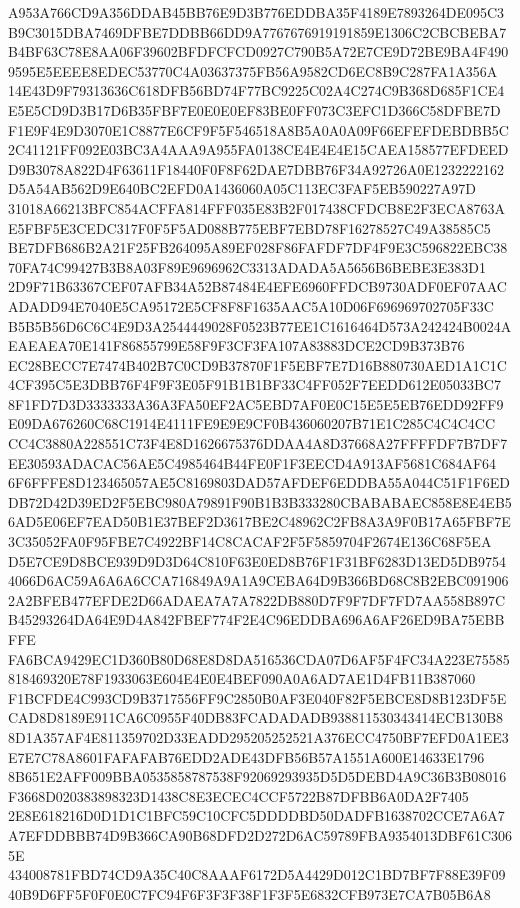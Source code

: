 \documentclass[UTF8,fontset=fandol,zihao=-4,a4paper]{ctexart}
\begin{document}
{{A953A766CD9A356DDAB45BB76E9D3B776EDDBA35F4189E7893264DE095C3B9C3015DBA7469DFBE7DDBB66DD9A7767676919191859E1306C2CBCBEBA7
B4BF63C78E8AA06F39602BFDFCFCD0927C790B5A72E7CE9D72BE9BA4F4909595E5EEEE8EDEC53770C4A03637375FB56A9582CD6EC8B9C287FA1A356A
14E43D9F79313636C618DFB56BD74F77BC9225C02A4C274C9B368D685F1CE4E5E5CD9D3B17D6B35FBF7E0E0E0EF83BE0FF073C3EFC1D366C58DFBE7D
F1E9F4E9D3070E1C8877E6CF9F5F546518A8B5A0A0A09F66EFEFDEBDBB5C2C41121FF092E03BC3A4AAA9A955FA0138CE4E4E4E15CAEA158577EFDEED
D9B3078A822D4F63611F18440F0F8F62DAE7DBB76F34A92726A0E1232222162D5A54AB562D9E640BC2EFD0A1436060A05C113EC3FAF5EB590227A97D
31018A66213BFC854ACFFA814FFF035E83B2F017438CFDCB8E2F3ECA8763AE5FBF5E3CEDC317F0F5F5AD088B775EBF7EBD78F16278527C49A38585C5
BE7DFB686B2A21F25FB264095A89EF028F86FAFDF7DF4F9E3C596822EBC3870FA74C99427B3B8A03F89E9696962C3313ADADA5A5656B6BEBE3E383D1
2D9F71B63367CEF07AFB34A52B87484E4EFE6960FFDCB9730ADF0EF07AACADADD94E7040E5CA95172E5CF8F8F1635AAC5A10D06F696969702705F33C
B5B5B56D6C6C4E9D3A2544449028F0523B77EE1C1616464D573A242424B0024AEAEAEA70E141F86855799E58F9F3CF3FA107A83883DCE2CD9B373B76
EC28BECC7E7474B402B7C0CD9B37870F1F5EBF7E7D16B880730AED1A1C1C4CF395C5E3DBB76F4F9F3E05F91B1B1BF33C4FF052F7EEDD612E05033BC7
8F1FD7D3D3333333A36A3FA50EF2AC5EBD7AF0E0C15E5E5EB76EDD92FF9E09DA676260C68C1914E4111FE9E9E9CF0B436060207B71E1C285C4C4C4CC
CC4C3880A228551C73F4E8D1626675376DDAA4A8D37668A27FFFFDF7B7DF7EE30593ADACAC56AE5C4985464B44FE0F1F3EECD4A913AF5681C684AF64
6F6FFFE8D123465057AE5C8169803DAD57AFDEF6EDDBA55A044C51F1F6EDDB72D42D39ED2F5EBC980A79891F90B1B3B333280CBABABAEC858E8E4EB5
6AD5E06EF7EAD50B1E37BEF2D3617BE2C48962C2FB8A3A9F0B17A65FBF7E3C35052FA0F95FBE7C4922BF14C8CACAF2F5F5859704F2674E136C68F5EA
D5E7CE9D8BCE939D9D3D64C810F63E0ED8B76F1F31BF6283D13ED5DB97544066D6AC59A6A6A6CCA716849A9A1A9CEBA64D9B366BD68C8B2EBC091906
2A2BFEB477EFDE2D66ADAEA7A7A7822DB880D7F9F7DF7FD7AA558B897CB45293264DA64E9D4A842FBEF774F2E4C96EDDBA696A6AF26ED9BA75EBBFFE
FA6BCA9429EC1D360B80D68E8D8DA516536CDA07D6AF5F4FC34A223E75585818469320E78F1933063E604E4E0E4BEF090A0A6AD7AE1D4FB11B387060
F1BCFDE4C993CD9B3717556FF9C2850B0AF3E040F82F5EBCE8D8B123DF5ECAD8D8189E911CA6C0955F40DB83FCADADADB938811530343414ECB130B8
8D1A357AF4E811359702D33EADD295205252521A376ECC4750BF7EFD0A1EE3E7E7C78A8601FAFAFAB76EDD2ADE43DFB56B57A1551A600E14633E1796
8B651E2AFF009BBA0535858787538F92069293935D5D5DEBD4A9C36B3B08016F3668D020383898323D1438C8E3ECEC4CCF5722B87DFBB6A0DA2F7405
2E8E618216D0D1D1C1BFC59C10CFC5DDDDBD50DADFB1638702CCE7A6A7A7EFDDBBB74D9B366CA90B68DFD2D272D6AC59789FBA9354013DBF61C3065E
434008781FBD74CD9A35C40C8AAAF6172D5A4429D012C1BD7BF7F88E39F0940B9D6FF5F0F0E0C7FC94F6F3F3F38F1F3F5E6832CFB973E7CA7B05B6A8
}}
\end{document}
